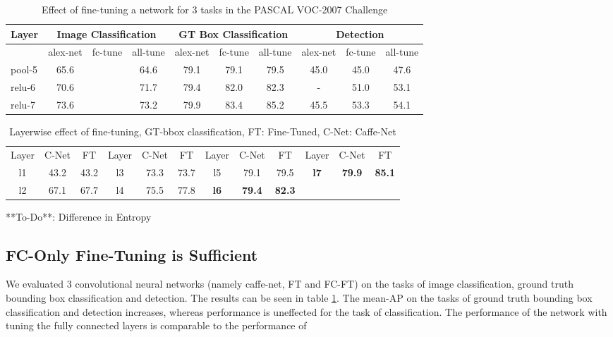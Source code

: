 \documentclass[runningheads]{llncs}
\begin{document}
\setlength{\tabcolsep}{2pt}
\begin{table}
\begin{center}
\caption{Effect of fine-tuning a network for 3 tasks in the PASCAL VOC-2007 Challenge}
\label{table:fine-effect}
\begin{tabular}{l|ccc|ccc|ccc}
\hline\noalign{\smallskip}
Layer & \multicolumn{3}{c}{Image Classification}  & \multicolumn{3}{c}{GT Box Classification} & \multicolumn{3}{c}{Detection} \\
\hline
      & alex-net & fc-tune & all-tune & alex-net & fc-tune & all-tune & alex-net & fc-tune & all-tune \\
\hline
pool-5   & 65.6 & & 64.6 & 79.1 & 79.1 & 79.5 & 45.0 & 45.0 & 47.6 \\
relu-6   & 70.6 & & 71.7 & 79.4 & 82.0 & 82.3 &  - & 51.0 & 53.1  \\
relu-7   & 73.6 & & 73.2 & 79.9 & 83.4 & 85.2  & 45.5 & 53.3 & 54.1 \\
\hline
\end{tabular}
\end{center}
\end{table}
\setlength{\tabcolsep}{1.4pt}


\setlength{\tabcolsep}{4pt}
\begin{table}
\begin{center}
\caption{Layerwise effect of fine-tuning, GT-bbox classification, FT: Fine-Tuned, C-Net: Caffe-Net}
\label{table:headings}
\begin{tabular}{ccc|ccc|ccc|ccc}
\hline\noalign{\smallskip}
Layer & C-Net & FT & Layer & C-Net & FT & Layer & C-Net & FT & Layer & C-Net & FT \\
\noalign{\smallskip}
\hline
\noalign{\smallskip}
l1 & 43.2 & 43.2 & l3 & 73.3 & 73.7 & l5 & 79.1 & 79.5 & \textbf{l7} & \textbf{79.9} & \textbf{85.1} \\
l2 & 67.1 & 67.7 & l4 & 75.5 & 77.8 & \textbf{l6} & \textbf{79.4} & \textbf{82.3} \\
\hline
\end{tabular}
\end{center}
\end{table}
\setlength{\tabcolsep}{1.4pt}

**To-Do**: Difference in Entropy


\subsection{FC-Only Fine-Tuning is Sufficient}
We evaluated 3 convolutional neural networks (namely caffe-net, FT and FC-FT) on the tasks of image classification, ground truth bounding box classification and detection. The results can be seen in table \ref{table:fine-effect}. The mean-AP on the tasks of ground truth bounding box classification and detection increases, whereas performance is uneffected for the task of classification. The performance of the network with tuning the fully connected layers is comparable to the performance of
\end{document}
